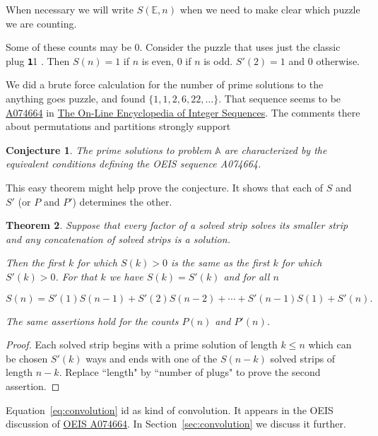 \documentclass[10pt]{article}
\newtheorem{theorem}{Theorem}
\newtheorem{conjecture}[theorem]{Conjecture}
\numberwithin{equation}{section}
\newcommand{\plug}[1]{%
\mbox{{\textbf\texttt #1}}
}
\newcommand{\puzzle}[1]{%
   \ensuremath{
   \mathbb{#1}
   }
}
\begin{document}
When necessary we will write $S(\puzzle{E},n)$ when we need to make clear which puzzle we are counting.

Some of these counts may be $0$. Consider the
puzzle that uses just the classic  plug \plug{11}.
Then $S(n) = 1$ if $n$ is even, $0$ if $n$ is odd. $S'(2) =1$ and
$0$  otherwise.


We did a brute force calculation for the number of prime solutions to the anything goes puzzle, and found $\{1,1,2,6,22, \ldots\}$. That sequence seems to be
\href{https://oeis.org/A074664}{A074664} in
\href{https://oeis.org}{The On-Line Encyclopedia of Integer
  Sequences}. The comments there about permutations and partitions
strongly support

\begin{conjecture}
The prime solutions to problem $\puzzle{A}$ are characterized by the
equivalent conditions defining the OEIS sequence A074664.
\end{conjecture}

This easy theorem might help prove the conjecture. It shows that each of $S$ and $S'$ (or $P$ and $P'$) determines the other.

\begin{theorem}\label{thm:primerecursion}
Suppose that every factor of a solved strip solves its smaller strip and any concatenation of solved strips is a solution.

 Then the  first $k$ for which $S(k) > 0$ is the same as the first $k$ for which $S'(k) > 0$. For that $k$ we have $S(k) = S'(k)$ and for all $n$
 
\begin{equation}\label{eq:convolution}
   S(n) = S'(1)S(n-1) +  S'(2)S(n-2) + \cdots +   S'(n-1)S(1) + S'(n) .
\end{equation}

The same assertions  hold for the counts $P(n)$ and $P'(n)$.
\end{theorem}
\begin{proof}
Each solved strip begins with a prime solution of length $k \le n$ which can be
chosen $S'(k)$ ways and ends with one of the $S(n-k)$ solved strips of
length $n-k$. 
Replace ``length" by ``number of plugs" to prove the second assertion.
\end{proof}

Equation~\ref{eq:convolution} id as kind of convolution. It appears in the OEIS discussion of \href{https://oeis.org/A074664}{OEIS A074664}. In Section~\ref{sec:convolution} we discuss it further.
\end{document}
